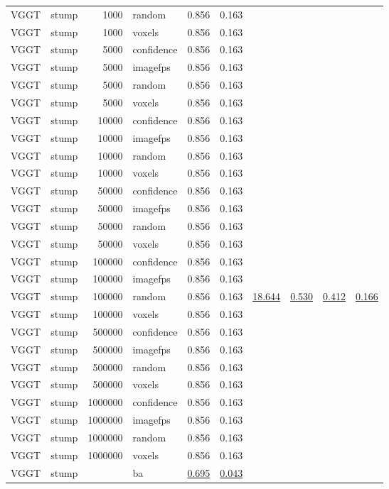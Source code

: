 \begin{table}[H]
\begin{tabular}{llrlrrrrrr}
VGGT & stump & 1000 & random & 0.856 & 0.163 &  &  &  &  \\
VGGT & stump & 1000 & voxels & 0.856 & 0.163 &  &  &  &  \\
VGGT & stump & 5000 & confidence & 0.856 & 0.163 &  &  &  &  \\
VGGT & stump & 5000 & imagefps & 0.856 & 0.163 &  &  &  &  \\
VGGT & stump & 5000 & random & 0.856 & 0.163 &  &  &  &  \\
VGGT & stump & 5000 & voxels & 0.856 & 0.163 &  &  &  &  \\
VGGT & stump & 10000 & confidence & 0.856 & 0.163 &  &  &  &  \\
VGGT & stump & 10000 & imagefps & 0.856 & 0.163 &  &  &  &  \\
VGGT & stump & 10000 & random & 0.856 & 0.163 &  &  &  &  \\
VGGT & stump & 10000 & voxels & 0.856 & 0.163 &  &  &  &  \\
VGGT & stump & 50000 & confidence & 0.856 & 0.163 &  &  &  &  \\
VGGT & stump & 50000 & imagefps & 0.856 & 0.163 &  &  &  &  \\
VGGT & stump & 50000 & random & 0.856 & 0.163 &  &  &  &  \\
VGGT & stump & 50000 & voxels & 0.856 & 0.163 &  &  &  &  \\
VGGT & stump & 100000 & confidence & 0.856 & 0.163 &  &  &  &  \\
VGGT & stump & 100000 & imagefps & 0.856 & 0.163 &  &  &  &  \\
VGGT & stump & 100000 & random & 0.856 & 0.163 & \underline{18.644} & \underline{0.530} & \underline{0.412} & \underline{0.166} \\
VGGT & stump & 100000 & voxels & 0.856 & 0.163 &  &  &  &  \\
VGGT & stump & 500000 & confidence & 0.856 & 0.163 &  &  &  &  \\
VGGT & stump & 500000 & imagefps & 0.856 & 0.163 &  &  &  &  \\
VGGT & stump & 500000 & random & 0.856 & 0.163 &  &  &  &  \\
VGGT & stump & 500000 & voxels & 0.856 & 0.163 &  &  &  &  \\
VGGT & stump & 1000000 & confidence & 0.856 & 0.163 &  &  &  &  \\
VGGT & stump & 1000000 & imagefps & 0.856 & 0.163 &  &  &  &  \\
VGGT & stump & 1000000 & random & 0.856 & 0.163 &  &  &  &  \\
VGGT & stump & 1000000 & voxels & 0.856 & 0.163 &  &  &  &  \\
VGGT & stump &  & ba & \underline{0.695} & \underline{0.043} &  &  &  &  \\
\bottomrule
\end{tabular}
\end{table}